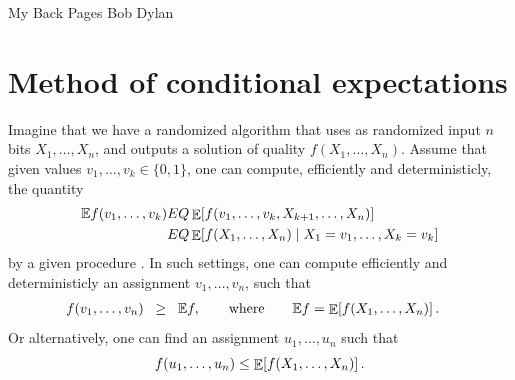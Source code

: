 
%


%
{My Back Pages}%
{Bob Dylan}


\noindent%
\ChapterPrefix{}%
\ChapterGen{}

\bigskip%



\newcommand{\evalEF}{\AlgorithmI{eval{\ensuremath{_{\ExChar f}}}}}

\section{Method of conditional expectations}

Imagine that we have a randomized algorithm that uses as randomized
input $n$ bits $X_1, \ldots, X_n$, and outputs a solution of quality
$f(X_1, \ldots, X_n)$. Assume that given values
$v_1, \ldots, v_k \in \{0,1\}$, one can compute, efficiently and
deterministicly, the quantity
\begin{align*}
    \ExChar f(v_1,\ldots, v_k)
    &EQ%
    \Ex{ f(v_1, \ldots, v_k, X_{k+1}, \ldots, X_n)}
    \\&
    EQ%
    \ExCond{ f(X_1, \ldots, X_n) }{X_1=v_1, \ldots, X_k=v_k}
\end{align*}
by a given procedure \evalEF.  In such settings, one can compute
efficiently and deterministicly an assignment $v_1, \ldots, v_n$, such
that
\begin{align*}
    f(v_1, \ldots, v_n)
    &\GEQ
    \ExChar f,
    \qquad \text{where}\qquad%
    \ExChar f = \Ex{f(X_1,\ldots, X_n)}.
\end{align*}
Or alternatively, one can find an assignment $u_1, \ldots, u_n$ such
that 
\begin{equation*}
    f(u_1, \ldots, u_n) \leq \mathop{\mathbb{E}}\!\left[ {f(X_1,\ldots, X_n)} \right].
\end{equation*}



